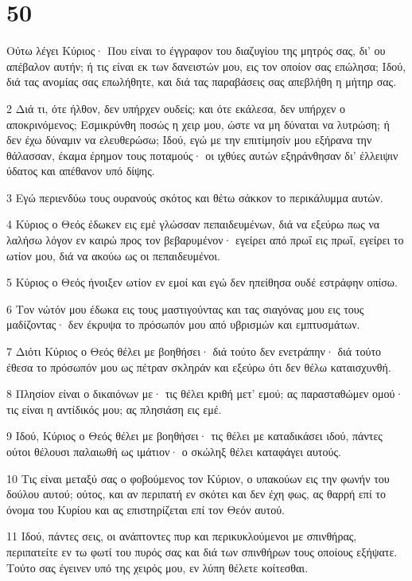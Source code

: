 \chapter{50}

\par Ούτω λέγει Κύριος· Που είναι το έγγραφον του διαζυγίου της μητρός σας, δι' ου απέβαλον αυτήν; ή τις είναι εκ των δανειστών μου, εις τον οποίον σας επώλησα; Ιδού, διά τας ανομίας σας επωλήθητε, και διά τας παραβάσεις σας απεβλήθη η μήτηρ σας.
\par 2 Διά τι, ότε ήλθον, δεν υπήρχεν ουδείς; και ότε εκάλεσα, δεν υπήρχεν ο αποκρινόμενος; Εσμικρύνθη ποσώς η χειρ μου, ώστε να μη δύναται να λυτρώση; ή δεν έχω δύναμιν να ελευθερώσω; Ιδού, εγώ με την επιτίμησίν μου εξήρανα την θάλασσαν, έκαμα έρημον τους ποταμούς· οι ιχθύες αυτών εξηράνθησαν δι' έλλειψιν ύδατος και απέθανον υπό δίψης.
\par 3 Εγώ περιενδύω τους ουρανούς σκότος και θέτω σάκκον το περικάλυμμα αυτών.
\par 4 Κύριος ο Θεός έδωκεν εις εμέ γλώσσαν πεπαιδευμένων, διά να εξεύρω πως να λαλήσω λόγον εν καιρώ προς τον βεβαρυμένον· εγείρει από πρωΐ εις πρωΐ, εγείρει το ωτίον μου, διά να ακούω ως οι πεπαιδευμένοι.
\par 5 Κύριος ο Θεός ήνοιξεν ωτίον εν εμοί και εγώ δεν ηπείθησα ουδέ εστράφην οπίσω.
\par 6 Τον νώτόν μου έδωκα εις τους μαστιγούντας και τας σιαγόνας μου εις τους μαδίζοντας· δεν έκρυψα το πρόσωπόν μου από υβρισμών και εμπτυσμάτων.
\par 7 Διότι Κύριος ο Θεός θέλει με βοηθήσει· διά τούτο δεν ενετράπην· διά τούτο έθεσα το πρόσωπόν μου ως πέτραν σκληράν και εξεύρω ότι δεν θέλω καταισχυνθή.
\par 8 Πλησίον είναι ο δικαιόνων με· τις θέλει κριθή μετ' εμού; ας παρασταθώμεν ομού· τις είναι η αντίδικός μου; ας πλησιάση εις εμέ.
\par 9 Ιδού, Κύριος ο Θεός θέλει με βοηθήσει· τις θέλει με καταδικάσει ιδού, πάντες ούτοι θέλουσι παλαιωθή ως ιμάτιον· ο σκώληξ θέλει καταφάγει αυτούς.
\par 10 Τις είναι μεταξύ σας ο φοβούμενος τον Κύριον, ο υπακούων εις την φωνήν του δούλου αυτού; ούτος, και αν περιπατή εν σκότει και δεν έχη φως, ας θαρρή επί το όνομα του Κυρίου και ας επιστηρίζεται επί τον Θεόν αυτού.
\par 11 Ιδού, πάντες σεις, οι ανάπτοντες πυρ και περικυκλούμενοι με σπινθήρας, περιπατείτε εν τω φωτί του πυρός σας και διά των σπινθήρων τους οποίους εξήψατε. Τούτο σας έγεινεν υπό της χειρός μου, εν λύπη θέλετε κοίτεσθαι.

